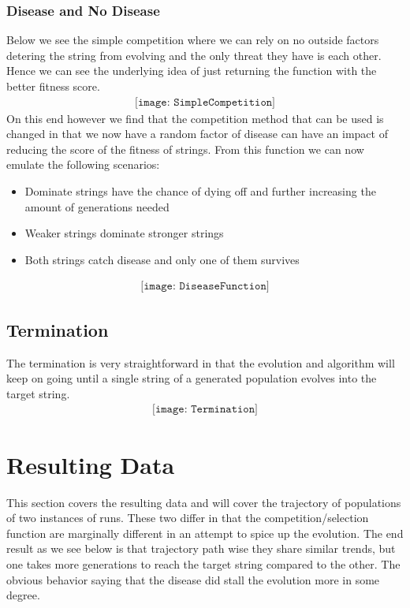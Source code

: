\documentclass[paper=a4, fontsize=11pt]{scrartcl}
\numberwithin{equation}{section}		%
\numberwithin{figure}{section}			%
\numberwithin{table}{section}				%
\begin{document}
    \subsubsection{Disease and No Disease}
    Below we see the simple competition where we can rely on no outside factors detering the string from evolving and the 
    only threat they have is each other.  Hence we can see the underlying idea of just returning the function with the 
    better fitness score.
    \begin{align} 
        \texttt{[image: SimpleCompetition]}				
    \end{align}
    On this end however we find that the competition method that can be used is changed in that we now have a random 
    factor of disease can have an impact of reducing the score of the fitness of strings. From this function we can now 
    emulate the following scenarios: 
    \begin{itemize}
        \item Dominate strings have the chance of dying off and further increasing the amount of generations needed
        \item Weaker strings dominate stronger strings
        \item Both strings catch disease and only one of them survives
    \end{itemize}
    \begin{align} 
        \texttt{[image: DiseaseFunction]}				
    \end{align}
    \subsection{Termination}
    The termination is very straightforward in that the evolution and algorithm will keep on going until a
    single string of a generated population evolves into the target string.
    \begin{align} 
        \texttt{[image: Termination]}				
    \end{align}

    \section{Resulting Data}
    This section covers the resulting data and will cover the trajectory of populations of two instances of 
    runs.  These two differ in that the competition/selection function are marginally different in an attempt 
    to spice up the evolution.  The end result as we see below is that trajectory path wise they share similar
    trends, but one takes more generations to reach the target string compared to the other.  The obvious behavior
    saying that the disease did stall the evolution more in some degree.
\end{document}
